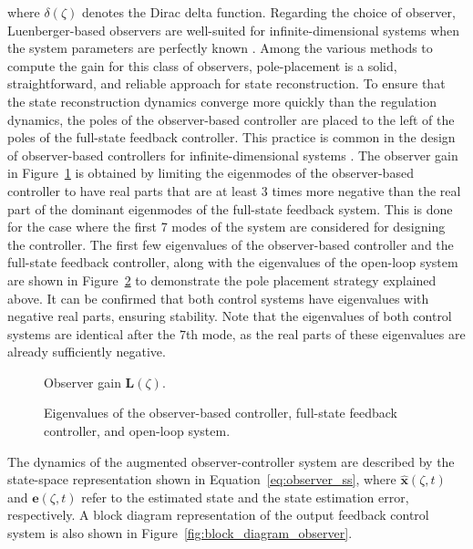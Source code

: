 where $\delta(\zeta)$ denotes the Dirac delta function. Regarding the choice of observer, Luenberger-based observers are well-suited for infinite-dimensional systems when the system parameters are perfectly known \autocite{ali2015reviewobserver}. Among the various methods to compute the gain for this class of observers, pole-placement is a solid, straightforward, and reliable approach for state reconstruction. To ensure that the state reconstruction dynamics converge more quickly than the regulation dynamics, the poles of the observer-based controller are placed to the left of the poles of the full-state feedback controller. This practice is common in the design of observer-based controllers for infinite-dimensional systems \autocite{morrisbook}. The observer gain in Figure~\ref{fig:L_modes} is obtained by limiting the eigenmodes of the observer-based controller to have real parts that are at least 3 times more negative than the real part of the dominant eigenmodes of the full-state feedback system. This is done for the case where the first 7 modes of the system are considered for designing the controller. The first few eigenvalues of the observer-based controller and the full-state feedback controller, along with the eigenvalues of the open-loop system are shown in Figure~\ref{fig:eigs} to demonstrate the pole placement strategy explained above. It can be confirmed that both control systems have eigenvalues with negative real parts, ensuring stability. Note that the eigenvalues of both control systems are identical after the 7th mode, as the real parts of these eigenvalues are already sufficiently negative.

\begin{figure}[!htbp]
    \centering
    
    \caption{Observer gain $\bm{L}(\zeta)$.}
    \label{fig:L_modes}
\end{figure}

\begin{figure}[!htbp]
    \centering
    
    \caption{Eigenvalues of the observer-based controller, full-state feedback controller, and open-loop system.}
    \label{fig:eigs}
\end{figure}

The dynamics of the augmented observer-controller system are described by the state-space representation shown in Equation~\ref{eq:observer_ss}, where $\hat{\bm{x}}(\zeta, t)$ and $\bm{e}(\zeta, t)$ refer to the estimated state and the state estimation error, respectively. A block diagram representation of the output feedback control system is also shown in Figure~\ref{fig:block_diagram_observer}.

